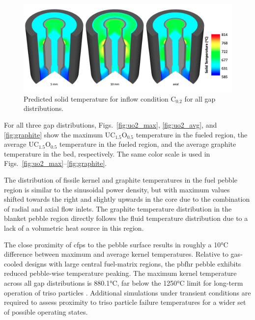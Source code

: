 \begin{figure}[h!]
\centering
\includegraphics[height=0.4\linewidth]{figs/solid_temp_noncore.png}
\caption{Predicted solid temperature for inflow condition C$_\text{0.2}$ for all gap distributions.}
\label{fig:solid_noncore}
\end{figure}

For all three gap distributions, Figs.\ \ref{fig:uo2_max}, \ref{fig:uo2_avg}, and \ref{fig:graphite} show the maximum UC$_{1.5}$O$_{0.5}$ temperature in the fueled region, the average UC$_{1.5}$O$_{0.5}$ temperature in the fueled region, and the average graphite temperature in the bed, respectively. The same color scale is used in Figs.\ \ref{fig:uo2_max}--\ref{fig:graphite}.

The distribution of fissile kernel and graphite temperatures in the fuel pebble region is similar to the sinusoidal power density, but with maximum values shifted towards the right and slightly upwards in the core due to the combination of radial and axial flow inlets. The graphite temperature distribution in the blanket pebble region directly follows the fluid temperature distribution due to a lack of a volumetric heat source in this region.

The close proximity of \glspl{cfp} to the pebble surface results in roughly a 10\si{\celsius} difference between maximum and average kernel temperatures. Relative to gas-cooled designs with large central fuel-matrix regions, the \gls{pbfhr} pebble exhibits reduced pebble-wise temperature peaking. The maximum kernel temperature across all gap distributions is 880.1\si{\celsius}, far below the 1250\si{\celsius} limit for long-term operation of \gls{triso} particles \cite{nabielek,demkowicz}. Additional simulations under transient conditions are required to assess proximity to \gls{triso} particle failure temperatures for a wider set of possible operating states. 

